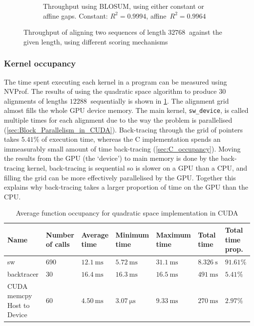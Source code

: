 \begin{figure}
\begin{subfigure}{.49\textwidth}
      \caption{Throughput using BLOSUM, using either constant or affine gaps. Constant: $R^2=0.9994$, \mbox{affine}~${R^2=0.9964}$}
      \label{fig:CU_Gotoh}
    \end{subfigure}
    \caption{Throughput of aligning two sequences of length $\SI{32768}{}$ against the given length, using different scoring mechanisms}
    \label{fig:CU_Scoring}
\end{figure}

\subsubsection{Kernel occupancy}
\label{sec:CUDA_occupancy}
The time spent executing each kernel in a program can be measured using NVProf.
The results of using the quadratic space algorithm to produce $30$ alignments of lengths $\SI{12288}{}$ sequentially is shown in \cref{tab:CUDA_Quadratic_Occupancy}.
The alignment grid almost fills the whole GPU device memory.
The main kernel, \lstinline{sw_device}, is called multiple times for each alignment due to the way the problem is parallelised (\cref{sec:Block_Parallelism_in_CUDA}).
Back-tracing through the grid of pointers takes $5.41\%$ of execution time, whereas the C implementation spends an immeasurably small amount of time back-tracing (\cref{sec:C_occupancy}).
Moving the results from the GPU (the `device') to main memory is done by the back-tracing kernel, back-tracing is sequential so is slower on a GPU than a CPU, and filling the grid can be more effectively parallelised by the GPU.
Together this explains why back-tracing takes a larger proportion of time on the GPU than the CPU.

\begin{table}
    \centering
    \begin{tabular}{|p{}|p{}p{}p{}p{}p{}p{}|} \hline
        Name & Number of calls & Average time & Minimum time & Maximum time & Total time  & Total time prop. \\ \hline
        {\ttfamily sw} & $690$ & $\SI{12.1}{\milli\s}$ & $\SI{5.72}{\milli\s}$ & $\SI{31.1}{\milli\s}$ & $\SI{8.326}{\s}$ & $91.61\%$ \\
        {\ttfamily backtracer} & $30$ & $\SI{16.4}{\milli\s}$ & $\SI{16.3}{\milli\s}$ & $\SI{16.5}{\milli\s}$ & $\SI{491}{\milli\s}$ & $5.41\%$ \\
        CUDA {\ttfamily memcpy} Host to Device & $60$ & $\SI{4.50}{\milli\s}$ & $\SI{3.07}{\micro\s}$ & $\SI{9.33}{\milli\s}$ & $\SI{270}{\milli\s}$ & $2.97\%$ \\ \hline
    \end{tabular}

    \caption{Average function occupancy for quadratic space implementation in CUDA}
    \label{tab:CUDA_Quadratic_Occupancy}
\end{table}

